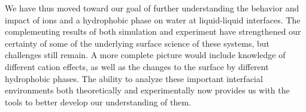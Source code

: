 We have thus moved toward our goal of further understanding the behavior and impact of ions and a hydrophobic phase on water at liquid-liquid interfaces. The complementing results of both simulation and experiment have strengthened our certainty of some of the underlying surface science of these systems, but challenges still remain. A more complete picture would include knowledge of different cation effects, as well as the changes to the surface by different hydrophobic phases. The ability to analyze these important interfacial environments both theoretically and experimentally now provides us with the tools to better develop our understanding of them.


